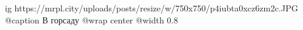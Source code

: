  
 
 
 
 

\ifcmt
  ig https://mrpl.city/uploads/posts/resize/w/750x750/p4iubta0xcz6zm2c.JPG
	@caption В горсаду
  @wrap center
  @width 0.8
\fi
